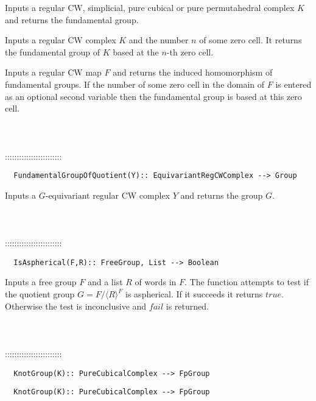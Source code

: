 \documentclass[a4paper,11pt]{report}
\begin{document}
{ 

 Inputs a regular CW, simplicial, pure cubical or pure permutahedral complex $K$ and returns the fundamental group. 

 Inputs a regular CW complex $K$ and the number $n$ of some zero cell. It returns the fundamental group of $K$ based at the $n$-th zero cell. 

 Inputs a regular CW map $F$ and returns the induced homomorphism of fundamental groups. If the number of
some zero cell in the domain of $F$ is entered as an optional second variable then the fundamental group is based
at this zero cell. \\
 \\
 \\
 \\
 ::::::::::::::::::::::::\\
 
\begin{verbatim}  FundamentalGroupOfQuotient(Y):: EquivariantRegCWComplex --> Group
\end{verbatim}


 

 Inputs a $G$-equivariant regular CW complex $Y$ and returns the group $G$. \\
 \\
 \\
 \\
 ::::::::::::::::::::::::\\
 
\begin{verbatim}  IsAspherical(F,R):: FreeGroup, List --> Boolean
\end{verbatim}


 

 Inputs a free group $F$ and a list $R$ of words in $F$. The function attempts to test if the quotient group $G=F/\langle R \rangle^F$ is aspherical. If it succeeds it returns $true$. Otherwise the test is inconclusive and $fail$ is returned. \\
 \\
 \\
 \\
 ::::::::::::::::::::::::\\
 
\begin{verbatim}  KnotGroup(K):: PureCubicalComplex --> FpGroup
\end{verbatim}
 
\begin{verbatim}  KnotGroup(K):: PureCubicalComplex --> FpGroup
\end{verbatim}


}
\end{document}
